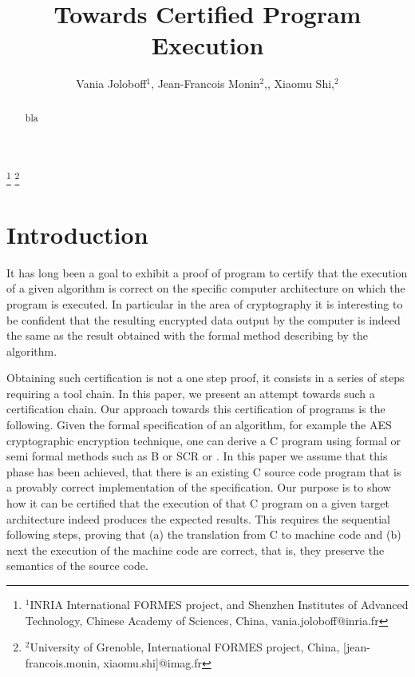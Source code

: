 \documentclass[a4paper, conference]{IEEEtran}
\begin{document}
\title{Towards Certified Program Execution}

\author{ Vania Joloboff$^1$, Jean-Francois Monin$^2$,, Xiaomu
  Shi,$^2$}
\thanks{$^1$INRIA International FORMES project, and
  Shenzhen Institutes of Advanced Technology, Chinese Academy of
  Sciences, China, vania.joloboff@inria.fr}
\thanks{$^2$University of Grenoble, International FORMES project, China,
 [jean-francois.monin, xiaomu.shi]@imag.fr}
\maketitle

\pagestyle{empty}
\thispagestyle{empty}

\begin{abstract}
bla
\end{abstract}



\section{Introduction} %

It has long been a goal to exhibit a proof of program to certify that the
execution of a given algorithm is correct on the specific computer architecture
on which the program is executed. In particular in the area of cryptography
it is interesting to be confident that the resulting encrypted data output
by the computer is indeed the same as the result obtained with the formal
method describing by the algorithm.

Obtaining such certification is not a one step proof, it consists in a
series of steps requiring a tool chain. In this paper, we present an
attempt towards such a certification chain. Our approach towards this
certification of programs is the following.  Given the formal
specification of an algorithm, for example the AES cryptographic
encryption technique, one can derive a C program using formal or semi
formal methods such as B \cite{abrial-1996} or SCR
\cite{rothamel-2006} or \cite{apts-2008}.  In this paper we assume
that this phase has been achieved, that there is an existing C source
code program that is a provably correct implementation of the
specification. Our purpose is to show how it can be certified that the
execution of that C program on a given target architecture indeed
produces the expected results.  This requires the sequential following
steps, proving that (a) the translation from C to machine code and (b)
next the execution of the machine code are correct, that is, they
preserve the semantics of the source code.
\end{document}
